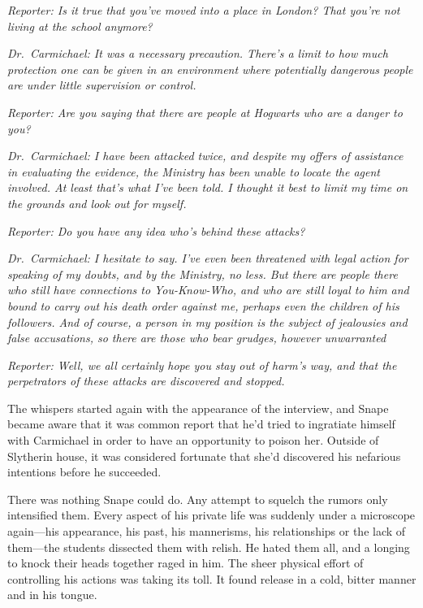 \emph{Reporter: Is it true that you've moved into a place in London? That you're not living at the school anymore?}

\emph{Dr.~Carmichael: It was a necessary precaution. There's a limit to how much protection one can be given in an environment where potentially dangerous people are under little supervision or control.}

\emph{Reporter: Are you saying that there are people at Hogwarts who are a danger to you?}

\emph{Dr.~Carmichael: I have been attacked twice, and despite my offers of assistance in evaluating the evidence, the Ministry has been unable to locate the agent involved. At least that's what I've been told. I thought it best to limit my time on the grounds and look out for myself.}

\emph{Reporter: Do you have any idea who's behind these attacks?}

\emph{Dr.~Carmichael: I hesitate to say. I've even been threatened with legal action for speaking of my doubts, and by the Ministry, no less. But there are people there who still have connections to You-Know-Who, and who are still loyal to him and bound to carry out his death order against me, perhaps even the children of his followers. And of course, a person in my position is the subject of jealousies and false accusations, so there are those who bear grudges, however unwarranted{\el}}

\emph{Reporter: Well, we all certainly hope you stay out of harm's way, and that the perpetrators of these attacks are discovered and stopped.}

The whispers started again with the appearance of the interview, and Snape became aware that it was common report that he'd tried to ingratiate himself with Carmichael in order to have an opportunity to poison her. Outside of Slytherin house, it was considered fortunate that she'd discovered his nefarious intentions before he succeeded.

There was nothing Snape could do. Any attempt to squelch the rumors only intensified them. Every aspect of his private life was suddenly under a microscope again—his appearance, his past, his mannerisms, his relationships or the lack of them—the students dissected them with relish. He hated them all, and a longing to knock their heads together raged in him. The sheer physical effort of controlling his actions was taking its toll. It found release in a cold, bitter manner and in his tongue.

